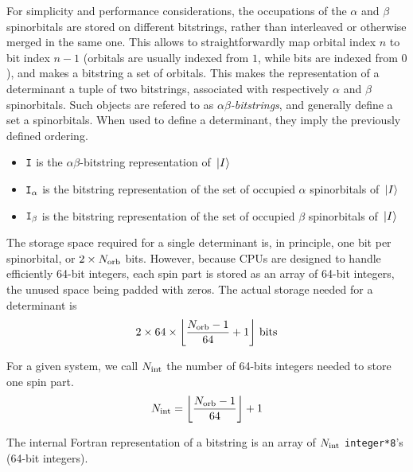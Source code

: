 \documentclass[./thesis.tex]{subfiles}
\begin{document}
For simplicity and performance considerations, the occupations of the $\alpha$ and $\beta$ spinorbitals are stored on different bitstrings, rather than interleaved or otherwise merged in the same one. This allows to straightforwardly map orbital index $n$ to bit index $n-1$ (orbitals are usually indexed from $1$, while bits are indexed from $0$), and makes a bitstring a set of orbitals.
This makes the representation of a determinant a tuple of two bitstrings, associated with respectively $\alpha$ and $\beta$ spinorbitals. Such objects are refered to as \emph{$\alpha \beta$-bitstrings}, and generally define a set a spinorbitals. When used to define a determinant, they imply the previously defined ordering.


\begin{itemize}
\item
${\texttt{I}}$ is the $\alpha \beta$-bitstring representation of ${\ket*{I}}$
\item
${\texttt{I}}_\alpha$ is the bitstring representation of the set of occupied $\alpha$ spinorbitals of ${\ket*{I}}$ 
\item
${\texttt{I}}_\beta$ is the bitstring representation of the set of occupied $\beta$ spinorbitals of ${\ket*{I}}$ 

\end{itemize}


The storage space required for a single determinant is, in principle, one bit per spinorbital, or $2 \times {N_\text{orb}}$ bits. However, because CPUs are designed to handle efficiently 64-bit integers, each spin part is stored as an array of 64-bit integers, the unused space being padded with zeros. 
The actual storage needed for a determinant is
$$
2 \times 64 \times  \left \lfloor \frac{{N_\text{orb}}-1}{64} + 1 \right \rfloor \, \text{bits}
\label{determinantstoragespace}
$$

For a given system, we call ${N_\text{int}}$ the number of 64-bits integers needed to store one spin part.
\begin{equation}
{N_\text{int}} = \left \lfloor \frac{{N_\text{orb}}-1}{64} \right \rfloor + 1
\end{equation}


The internal Fortran representation of a bitstring is an array of ${N_\text{int}}$ \lstinline{integer*8}'s (64-bit integers).
\end{document}
